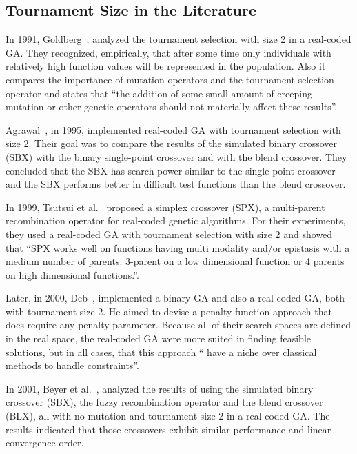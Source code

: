 \subsection{Tournament Size in the Literature}\label{sec:background:tournament_size} 

In 1991, Goldberg~\cite{goldberg1991real}, analyzed the tournament selection with size 2 in a real-coded GA. They recognized, empirically, that after some time only individuals with relatively high function values will be represented in the population. Also it compares the importance of mutation operators and the tournament selection operator and states that ``the addition of some small amount of creeping mutation or other genetic operators should not materially affect these results''.


Agrawal~\cite{agrawal1995simulated}, in 1995, implemented real-coded GA with tournament selection with size 2. Their goal was to compare the results of the simulated binary crossover (SBX) with the binary single-point crossover and with the blend crossover. They concluded that the SBX has search power similar to the single-point crossover and the SBX performs better in difficult test functions than the blend crossover. 

In 1999, Tsutsui et al.~\cite{tsutsui1999multi} proposed a simplex crossover (SPX), a multi-parent recombination operator for real-coded genetic algorithms. For their experiments, they used a real-coded GA with tournament selection with size 2 and showed that ``SPX works well on functions having multi modality and/or epistasis with a medium number of parents: 3-parent on a low dimensional function or 4 parents on high dimensional functions.''. 

Later, in 2000, Deb~\cite{deb2000efficient}, implemented a binary GA and also a real-coded GA, both with tournament size 2. He aimed to devise a penalty function approach that does require any penalty parameter. Because all of their search spaces are defined in the real space, the real-coded GA were more suited in finding feasible solutions, but in all cases, that this approach `` have a niche over classical methods to handle constraints''.


In 2001, Beyer et al.~\cite{beyer2001self}, analyzed the results of using the simulated binary crossover (SBX), the fuzzy recombination operator and the blend crossover (BLX), all with no mutation and tournament size 2 in a real-coded GA. The results indicated that those crossovers exhibit similar performance and linear convergence order.


